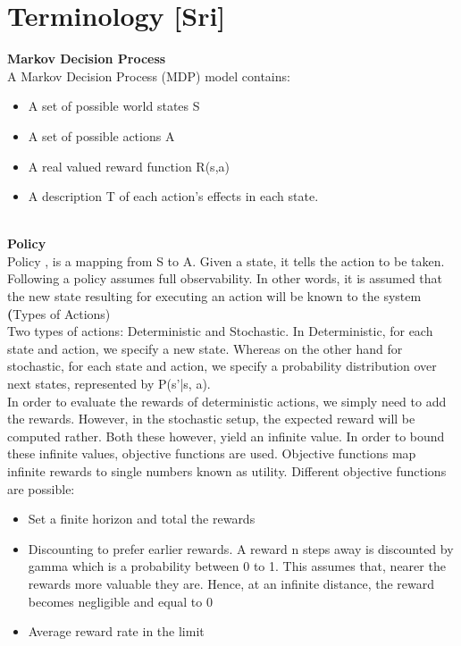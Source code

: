 \section{Terminology [Sri]}
\textbf{Markov Decision Process} \\

A Markov Decision Process (MDP) model contains: 
\begin{itemize}
\item A set of possible world states S 
\item A set of possible actions A 
\item A real valued reward function R(s,a) 
\item A description T of each action’s effects in each state.
\end{itemize}
\\
\textbf{Policy} \\
Policy \pi, is a mapping from S to A. Given a state, it tells the action to be taken. Following a policy assumes full observability. In other words, it is assumed that the new state resulting for executing an action will be known to the system
\\

\textbf(Types of Actions)\\
Two types of actions: Deterministic and Stochastic. In Deterministic, for each state and action, we specify a new state. Whereas on the other hand for stochastic, for each state and action, we specify a probability distribution over next states, represented by P(s’|s, a). \\

In order to evaluate the rewards of deterministic actions, we simply need to add the rewards. However, in the stochastic setup, the expected reward will be computed rather. Both these however, yield an infinite value. In order to bound these infinite values, objective functions are used. Objective functions map infinite rewards to single numbers known as utility. Different objective functions are possible:

\begin{itemize}
\item Set a finite horizon and total the rewards
\item Discounting to prefer earlier rewards. A reward n steps away is discounted by gamma which is a probability between 0 to 1. This assumes that, nearer the rewards more valuable they are. Hence, at an infinite distance, the reward becomes negligible and equal to 0
\item Average reward rate in the limit 
\end{itemize}
\\


